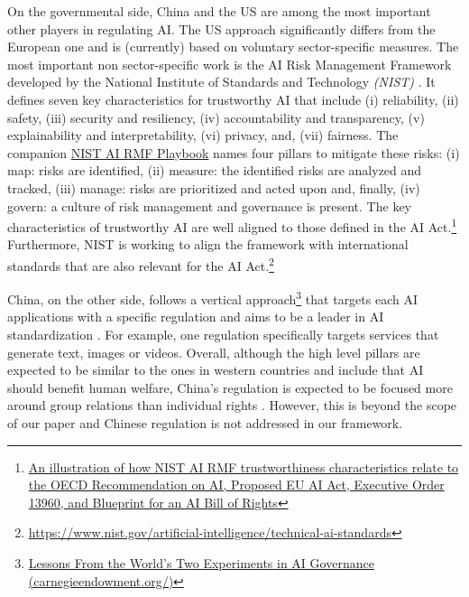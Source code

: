 On the governmental side, China and the US are among the most important other players in regulating AI. The US approach significantly differs from the European one and is (currently) based on voluntary sector-specific measures. The most important non sector-specific work is the AI Risk Management Framework developed by the National Institute of Standards and Technology \emph{(NIST)} \citep{NISTAIRMF_2023}. It defines seven key characteristics for trustworthy AI that include (i) reliability, (ii) safety, (iii) security and resiliency, (iv) accountability and transparency,  (v) explainability and interpretability, (vi) privacy, and, (vii)  fairness. The companion \href{https://airc.nist.gov/AI_RMF_Knowledge_Base/Playbook}{NIST AI RMF Playbook} names four pillars to mitigate these risks: (i) map: risks are identified, (ii) measure: the identified risks are analyzed and tracked, (iii) manage: risks are prioritized and acted upon and, finally, (iv) govern: a culture of risk management and governance is present. The key characteristics of trustworthy AI are well aligned to those defined in the AI Act.\footnote{\href{https://www.nist.gov/system/files/documents/2023/01/26/crosswalk_AI_RMF_1_0_OECD_EO_AIA_BoR.pdf}{An illustration of how NIST AI RMF trustworthiness characteristics
relate to the OECD Recommendation on AI, Proposed EU AI Act, Executive Order 13960, and Blueprint for an AI Bill of Rights}} Furthermore, NIST is working to 
 align the framework with international standards that are also relevant for the AI Act.\footnote{\url{https://www.nist.gov/artificial-intelligence/technical-ai-standards}}

China, on the other side, follows a vertical approach\footnote{\href{https://carnegieendowment.org/2023/02/14/lessons-from-world-s-two-experiments-in-ai-governance-pub-89035}{Lessons From the World’s Two Experiments in AI Governance (carnegieendowment.org/)}} that targets each AI applications with a specific regulation and aims to be a leader in AI standardization \citep{Huw_2021_ChinaAIRegulation}. For example, one regulation specifically targets services that generate text, images or videos. Overall, although the high level pillars are expected to be similar to the ones in western countries and include that AI should benefit human welfare, China's regulation is expected to be focused more around group relations than individual rights \citep{Huw_2021_ChinaAIRegulation}. However, this is beyond the scope of our paper and Chinese regulation is not addressed in our framework.


